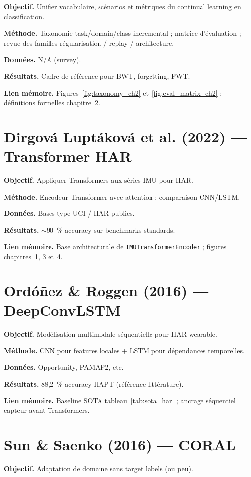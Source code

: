 \documentclass[a4paper,12pt]{report}
\begin{document}
\textbf{Objectif.} Unifier vocabulaire, scénarios et métriques du continual
learning en classification.

\textbf{Méthode.} Taxonomie task/domain/class-incremental ; matrice d'évaluation ;
revue des familles régularisation / replay / architecture.

\textbf{Données.} N/A (survey).

\textbf{Résultats.} Cadre de référence pour BWT, forgetting, FWT.

\textbf{Lien mémoire.} Figures~\ref{fig:taxonomy_ch2} et~\ref{fig:eval_matrix_ch2} ;
définitions formelles chapitre~2.

\section{Dirgová Luptáková et al. (2022) — Transformer HAR}

\textbf{Objectif.} Appliquer Transformers aux séries IMU pour HAR.

\textbf{Méthode.} Encodeur Transformer avec attention ; comparaison CNN/LSTM.

\textbf{Données.} Bases type UCI / HAR publics.

\textbf{Résultats.} $\sim$90~\% accuracy sur benchmarks standards.

\textbf{Lien mémoire.} Base architecturale de \texttt{IMUTransformerEncoder} ;
figures chapitres~1, 3 et~4.

\section{Ordóñez \& Roggen (2016) — DeepConvLSTM}

\textbf{Objectif.} Modélisation multimodale séquentielle pour HAR wearable.

\textbf{Méthode.} CNN pour features locales + LSTM pour dépendances temporelles.

\textbf{Données.} Opportunity, PAMAP2, etc.

\textbf{Résultats.} 88,2~\% accuracy HAPT (référence littérature).

\textbf{Lien mémoire.} Baseline SOTA tableau~\ref{tab:sota_har} ; ancrage
séquentiel capteur avant Transformers.

\section{Sun \& Saenko (2016) — CORAL}

\textbf{Objectif.} Adaptation de domaine sans target labels (ou peu).
\end{document}
